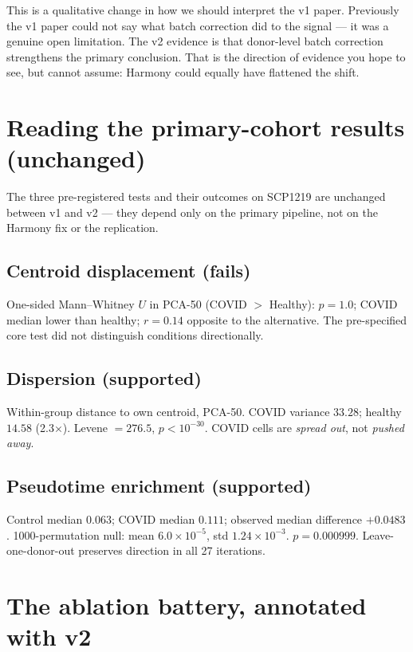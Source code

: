 \documentclass[11pt]{article}
\begin{document}
This is a qualitative change in how we should interpret the v1 paper. Previously the
v1 paper could not say what batch correction did to the signal --- it was a genuine
open limitation. The v2 evidence is that donor-level batch correction strengthens the
primary conclusion. That is the direction of evidence you hope to see, but cannot
assume: Harmony could equally have flattened the shift.

\section{Reading the primary-cohort results (unchanged)}

The three pre-registered tests and their outcomes on SCP1219 are unchanged between
v1 and v2 --- they depend only on the primary pipeline, not on the Harmony fix or the
replication.

\subsection{Centroid displacement (fails)}

One-sided Mann--Whitney $U$ in PCA-50 (COVID $>$ Healthy): $p=1.0$; COVID median
lower than healthy; $r=0.14$ opposite to the alternative. The pre-specified core test
did not distinguish conditions directionally.

\subsection{Dispersion (supported)}

Within-group distance to own centroid, PCA-50. COVID variance $33.28$; healthy $14.58$
(2.3$\times$). Levene $=276.5$, $p<10^{-30}$. COVID cells are \emph{spread out}, not
\emph{pushed away}.

\subsection{Pseudotime enrichment (supported)}

Control median $0.063$; COVID median $0.111$; observed median difference $+0.0483$.
1000-permutation null: mean $6.0\times10^{-5}$, std $1.24\times10^{-3}$. $p=0.000999$.
Leave-one-donor-out preserves direction in all 27 iterations.

\section{The ablation battery, annotated with v2}
\end{document}
